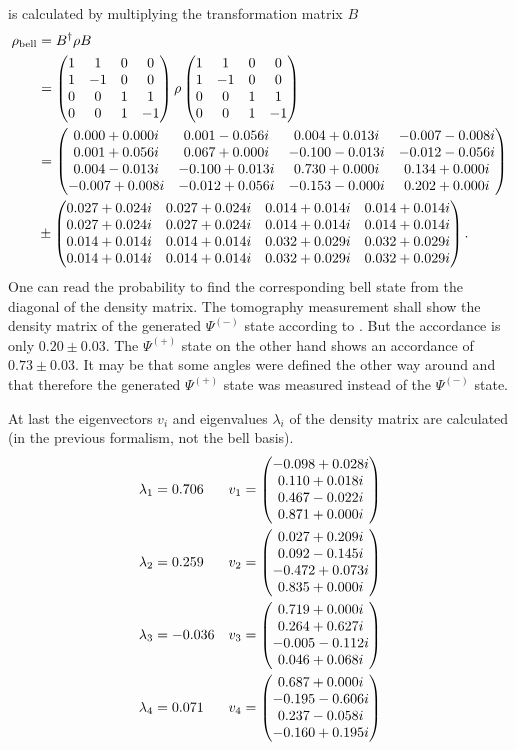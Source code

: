 is calculated by multiplying the transformation matrix $B$
\begin{align}
\rho_\text{bell}
    &=B^\dagger \rho B
    \label{eq:a:rho_bell}\\
    &=\begin{pmatrix}
    1&1&0&0\\
    1&-1&0&0\\
    0&0&1&1\\
    0&0&1&-1\\
    \end{pmatrix}
    \rho
    \begin{pmatrix}
    1&1&0&0\\
    1&-1&0&0\\
    0&0&1&1\\
    0&0&1&-1\\
    \end{pmatrix}
    \nonumber\\
    &=\rhobell
    \nonumber\\
    &\pm \drhobell .
    \nonumber
\end{align}
One can read the probability to find the corresponding bell state from the diagonal of the density matrix.
The tomography measurement shall show the density matrix of the generated $\Psi^{(-)}$ state according to \cite{barz}.
But the accordance is only $0.20\pm 0.03$.
The $\Psi^{(+)}$ state on the other hand shows an accordance of $0.73\pm0.03$.
It may be that some angles were defined the other way around and that therefore the generated $\Psi^{(+)}$ state was measured instead of the $\Psi^{(-)}$ state.

At last the eigenvectors $v_i$ and eigenvalues $\lambda_i$ of the density matrix are calculated (in the previous formalism, not the bell basis).
\begin{align*}
\lambda_1
    &=\evala
    &v_1
    &=\eveca
    \\
\lambda_2
    &=\evalb
    &v_2
    &=\evecb
    \\
\lambda_3
    &=\evalc
    &v_3
    &=\evecc
    \\
\lambda_4
    &=\evald
    &v_4
    &=\evecd
\end{align*}


